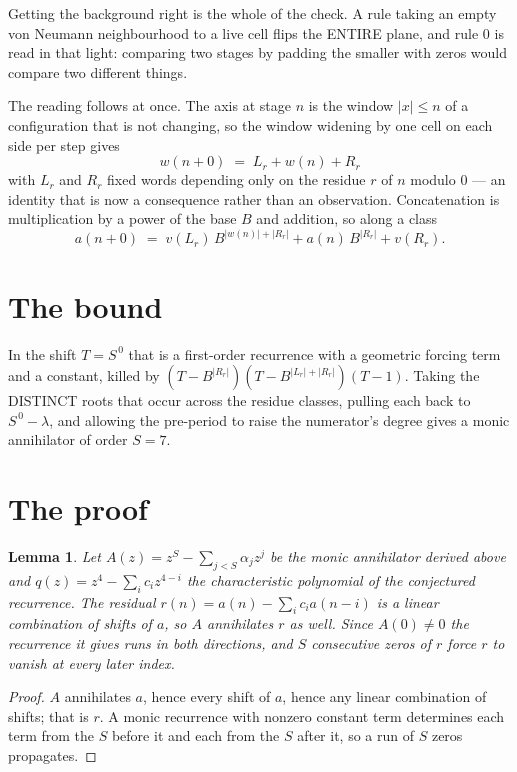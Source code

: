 \documentclass[11pt,a4paper]{article}
\theoremstyle{plain}
\newtheorem{lemma}[theorem]{Lemma}
\theoremstyle{definition}
\begin{document}
Getting the background right is the whole of the check. A rule taking an empty von Neumann
neighbourhood to a live cell flips the ENTIRE plane, and rule 0 is read
in that light: comparing two stages by padding the smaller with zeros would compare two
different things.

The reading follows at once. The axis at stage $n$ is the window $|x|\le n$ of a configuration
that is not changing, so the window widening by one cell on each side per step gives
\[
w(n+0)\;=\;L_r + w(n) + R_r
\]
with $L_r$ and $R_r$ fixed words depending only on the residue $r$ of $n$ modulo $0$ --- an
identity that is now a consequence rather than an observation. Concatenation is multiplication
by a power of the base $B$ and addition, so along a class
\[
a(n+0)\;=\;v(L_r)\,B^{|w(n)|+|R_r|} + a(n)\,B^{|R_r|} + v(R_r).
\]

\section{The bound}

In the shift $T=S^{\,0}$ that is a first-order recurrence with a geometric forcing term and a
constant, killed by $(T-B^{|R_r|})(T-B^{|L_r|+|R_r|})(T-1)$. Taking the DISTINCT roots that
occur across the residue classes, pulling each back to $S^{\,0}-\lambda$, and allowing the
pre-period to raise the numerator's degree gives a monic annihilator of order $S=7$.

\section{The proof}

\begin{lemma}\label{lem:crit}
Let $A(z)=z^S-\sum_{j<S}\alpha_jz^{j}$ be the monic annihilator derived above and
$q(z)=z^{4}-\sum_ic_iz^{4-i}$ the characteristic polynomial of the conjectured
recurrence. The residual $r(n)=a(n)-\sum_ic_ia(n-i)$ is a linear combination of shifts of $a$,
so $A$ annihilates $r$ as well. Since $A(0)\ne0$ the recurrence it gives runs in both
directions, and $S$ consecutive zeros of $r$ force $r$ to vanish at every later index.
\end{lemma}

\begin{proof}
$A$ annihilates $a$, hence every shift of $a$, hence any linear combination of shifts; that is
$r$. A monic recurrence with nonzero constant term determines each term from the $S$ before it
and each from the $S$ after it, so a run of $S$ zeros propagates.
\end{proof}
\end{document}
